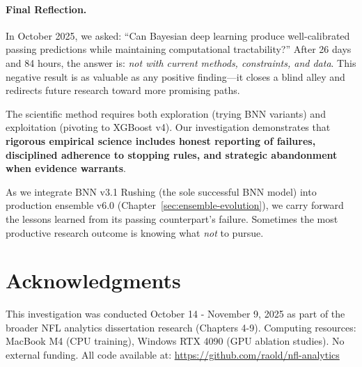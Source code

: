 \paragraph{Final Reflection.}
In October 2025, we asked: ``Can Bayesian deep learning produce well-calibrated passing predictions while maintaining computational tractability?'' After 26 days and 84 hours, the answer is: \textit{not with current methods, constraints, and data}. This negative result is as valuable as any positive finding---it closes a blind alley and redirects future research toward more promising paths.

The scientific method requires both exploration (trying BNN variants) and exploitation (pivoting to XGBoost v4). Our investigation demonstrates that \textbf{rigorous empirical science includes honest reporting of failures, disciplined adherence to stopping rules, and strategic abandonment when evidence warrants}.

As we integrate BNN v3.1 Rushing (the sole successful BNN model) into production ensemble v6.0 (Chapter~\ref{sec:ensemble-evolution}), we carry forward the lessons learned from its passing counterpart's failure. Sometimes the most productive research outcome is knowing what \textit{not} to pursue.

\section*{Acknowledgments}

This investigation was conducted October 14 - November 9, 2025 as part of the broader NFL analytics dissertation research (Chapters 4-9). Computing resources: MacBook M4 (CPU training), Windows RTX 4090 (GPU ablation studies). No external funding. All code available at: \url{https://github.com/raold/nfl-analytics}

